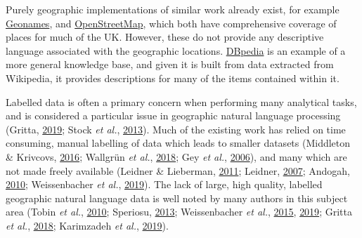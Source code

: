 \documentclass[10pt,]{article}
\begin{document}
Purely geographic implementations of similar work already exist, for
example \href{https://geonames.org}{Geonames}, and
\href{https://openstreetmap.org}{OpenStreetMap}, which both have
comprehensive coverage of places for much of the UK. However, these do
not provide any descriptive language associated with the geographic
locations. \href{http://dbpedia.org}{DBpedia} is an example of a more
general knowledge base, and given it is built from data extracted from
Wikipedia, it provides descriptions for many of the items contained
within it.

Labelled data is often a primary concern when performing many analytical
tasks, and is considered a particular issue in geographic natural
language processing (Gritta, \protect\hyperlink{ref-gritta2019}{2019};
Stock \emph{et al.}, \protect\hyperlink{ref-stock2013}{2013}). Much of
the existing work has relied on time consuming, manual labelling of data
which leads to smaller datasets (Middleton \& Krivcovs,
\protect\hyperlink{ref-middleton2016}{2016}; Wallgrün \emph{et al.},
\protect\hyperlink{ref-wallgrun2018}{2018}; Gey \emph{et al.},
\protect\hyperlink{ref-gey2006}{2006}), and many which are not made
freely available (Leidner \& Lieberman,
\protect\hyperlink{ref-leidner2011}{2011}; Leidner,
\protect\hyperlink{ref-leidner2007}{2007}; Andogah,
\protect\hyperlink{ref-andogah2010}{2010}; Weissenbacher \emph{et al.},
\protect\hyperlink{ref-weissenbacher2019}{2019}). The lack of large,
high quality, labelled geographic natural language data is well noted by
many authors in this subject area (Tobin \emph{et al.},
\protect\hyperlink{ref-tobin2010}{2010}; Speriosu,
\protect\hyperlink{ref-speriosu2013}{2013}; Weissenbacher \emph{et al.},
\protect\hyperlink{ref-weissenbacher2015}{2015},
\protect\hyperlink{ref-weissenbacher2019}{2019}; Gritta \emph{et al.},
\protect\hyperlink{ref-gritta2018}{2018}; Karimzadeh \emph{et al.},
\protect\hyperlink{ref-karimzadeh2019}{2019}).
\end{document}
